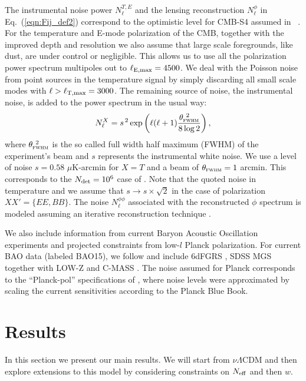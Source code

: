 \documentclass[aps,prd,reprint,superscriptaddress,nofootinbib]{revtex4-1}
\newcommand\refeq[1]{Eq.~(\ref{eqn:#1})}
\begin{document}
The instrumental noise power $N_{\ell}^{T,E}$ and the lensing reconstruction $N_{\ell}^{\phi}$ in \refeq{Fij_def2} correspond to the optimistic level for CMB-S4 assumed in ~\cite{2013arXiv1309.5383A,wu:2014,2013PhRvD..87h3008H}.
For the temperature and E-mode polarization of the CMB, together with the improved depth and resolution we also assume that large scale foregrounds, like dust, are under control or negligible. This allows us to use all the polarization power spectrum multipoles out to $\ell_{\rm E,max}=4500$. We deal with the Poisson noise from point sources in the temperature signal by simply discarding all small scale modes with $\ell>\ell_{\rm T,max}=3000$.
The remaining source of noise, the instrumental noise, is added to the power spectrum in the usual way:
 \begin{equation}
 	\centering
		N^{X}_\ell = s^{\, 2} \exp \left(\ell(\ell+1) \frac{\theta^{\ 2}_{\textsc{fwhm}}}{8\log2}\right),
	\label{eq:beamnoise}
\end{equation}
where $\theta^{\ 2}_{\textsc{fwhm}}$ is the so called full width half maximum (FWHM) of the experiment's beam and $s$ represents the instrumental white noise.
We use a level of noise $s = 0.58$ $\mu$K-arcmin for $X=T$ and a beam of $\theta_{\textsc{fwhm}}=1$ arcmin. This corresponds to the $N_{\rm det}=10^{6}$ case of \cite{wu:2014}. 
Note that the quoted noise in temperature and we assume that $s \rightarrow s\times \sqrt{2}$ in the case of polarization $ XX' = \{ EE, BB \}$. 
The noise $N_\ell^{\phi\phi}$ associated with the reconstructed $\phi$ spectrum is modeled assuming an iterative reconstruction technique \cite{seljak:2004}. 

We also include information from current Baryon Acoustic Oscillation experiments and projected constraints from low-$l$ Planck polarization. 
For current BAO data (labeled BAO15), we follow \cite{allison:2015} and include 6dFGRS \cite{beutler:2011}, SDSS MGS \cite{ross:2015} together with LOW-Z and C-MASS \cite{anderson:2014}.
The noise assumed for Planck corresponds to the ``Planck-pol'' specifications of \cite{allison:2015}, where noise levels were approximated by scaling the current sensitivities according to the Planck Blue Book.


\section{Results \label{sec:results}}
In this section we present our main results. We will start from $\nu \Lambda$CDM and then explore extensions to this model by considering constraints on $N_{\rm eff}$ and then $w$.
\end{document}
